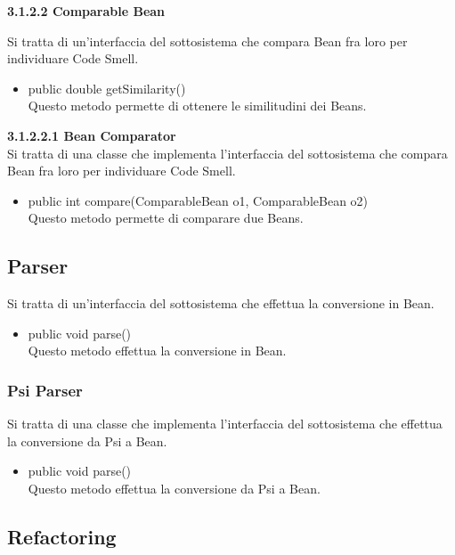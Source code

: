 \documentclass[11pt]{article}
\begin{document}
\begin{description}
			\item \textbf{3.1.2.2 Comparable Bean}
			\item Si tratta di un'interfaccia del sottosistema che compara Bean fra loro per individuare Code Smell.
			\begin{itemize}
				\item  public double getSimilarity()\\
				Questo metodo permette di ottenere le similitudini dei Beans.		
			\end{itemize}
			\item \textbf{ 3.1.2.2.1 Bean Comparator}\\
			Si tratta di una classe che implementa l'interfaccia del sottosistema che compara Bean fra loro per individuare Code Smell.
			\begin{itemize}
				\item  public int compare(ComparableBean o1, ComparableBean o2)\\
				Questo metodo permette di comparare due Beans.		
			\end{itemize}
	\end{description}		
			
		\subsection{Parser}
		Si tratta di un'interfaccia del sottosistema che effettua la conversione in Bean.
		\begin{itemize}
			\item public void parse()\\Questo metodo effettua la conversione in Bean.
		\end{itemize}
		\subsubsection{Psi Parser}
		Si tratta di una classe che implementa l'interfaccia del sottosistema che effettua la conversione da Psi a Bean.
		\begin{itemize}
			\item public void parse()\\Questo metodo effettua la conversione da Psi a Bean.
		\end{itemize}
		
			
	
		\subsection{Refactoring}
	
\end{document}
